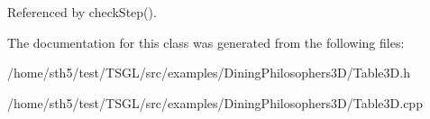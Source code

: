 Referenced by check\+Step().



The documentation for this class was generated from the following files\+:\begin{DoxyCompactItemize}
\item 
/home/sth5/test/\+T\+S\+G\+L/src/examples/\+Dining\+Philosophers3\+D/Table3\+D.\+h\item 
/home/sth5/test/\+T\+S\+G\+L/src/examples/\+Dining\+Philosophers3\+D/Table3\+D.\+cpp\end{DoxyCompactItemize}
